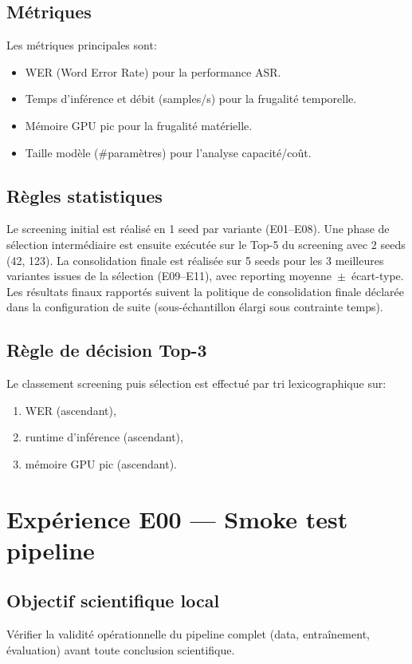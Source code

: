 \documentclass[11pt,a4paper]{article}
\begin{document}
\subsection{Métriques}
Les métriques principales sont:
\begin{itemize}
\item WER (Word Error Rate) pour la performance ASR.
\item Temps d'inférence et débit (samples/s) pour la frugalité temporelle.
\item Mémoire GPU pic pour la frugalité matérielle.
\item Taille modèle (\#paramètres) pour l'analyse capacité/coût.
\end{itemize}

\subsection{Règles statistiques}
Le screening initial est réalisé en 1 seed par variante (E01--E08).
Une phase de sélection intermédiaire est ensuite exécutée sur le Top-5 du screening avec 2 seeds (42, 123).
La consolidation finale est réalisée sur 5 seeds pour les 3 meilleures variantes issues de la sélection (E09--E11), avec reporting moyenne~$\pm$~écart-type.
Les résultats finaux rapportés suivent la politique de consolidation finale déclarée dans la configuration de suite (sous-échantillon élargi sous contrainte temps).

\subsection{Règle de décision Top-3}
Le classement screening puis sélection est effectué par tri lexicographique sur:
\begin{enumerate}
\item WER (ascendant),
\item runtime d'inférence (ascendant),
\item mémoire GPU pic (ascendant).
\end{enumerate}


\section{Expérience E00 --- Smoke test pipeline}
\subsection{Objectif scientifique local}
Vérifier la validité opérationnelle du pipeline complet (data, entraînement, évaluation) avant toute conclusion scientifique.
\end{document}
